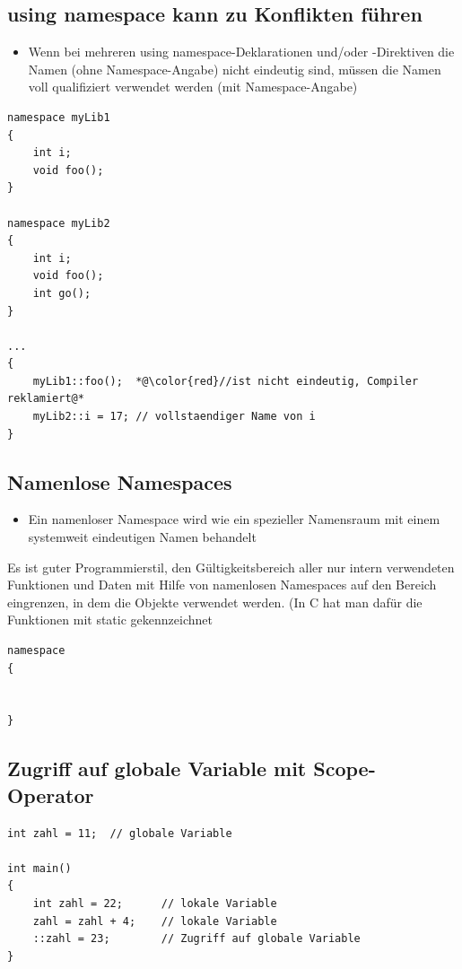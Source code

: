 \subsection{using namespace kann zu Konflikten führen}
\label{sec:using namespace kann zu Konflikten fuehren}
\begin{itemize}
	\item Wenn bei mehreren using namespace-Deklarationen und/oder -Direktiven die Namen (ohne Namespace-Angabe) nicht eindeutig sind, müssen die Namen voll qualifiziert verwendet werden (mit Namespace-Angabe)
\end{itemize}
\noindent
\begin{minipage}{\linewidth}
\begin{lstlisting}
namespace myLib1
{
	int i;
	void foo();
}

namespace myLib2
{
	int i;
	void foo();
	int go();
}

...
{
	myLib1::foo();	*@\color{red}//ist nicht eindeutig, Compiler reklamiert@*
	myLib2::i = 17;	// vollstaendiger Name von i
}
\end{lstlisting}
\end{minipage}

\subsection{Namenlose Namespaces}
\label{sec:Namenlose Namespaces}
\begin{itemize}
	\item Ein namenloser Namespace wird wie ein spezieller Namensraum mit einem systemweit eindeutigen Namen behandelt
\end{itemize}
\begin{hinweis}
Es ist guter Programmierstil, den Gültigkeitsbereich aller nur intern verwendeten Funktionen und Daten mit Hilfe von namenlosen Namespaces auf den Bereich eingrenzen, in dem die Objekte verwendet werden. (In C hat man dafür die Funktionen mit static gekennzeichnet
\end{hinweis}
\noindent
\begin{minipage}{\linewidth}
\begin{lstlisting}
namespace
{


}
\end{lstlisting}
\end{minipage}

\subsection{Zugriff auf globale Variable mit Scope-Operator}
\label{sec:Zugriff auf globale Variable mit Scope-Operator}
\noindent
\begin{minipage}{\linewidth}
\begin{lstlisting}
int zahl = 11;	// globale Variable

int main()
{
	int zahl = 22;		// lokale Variable
	zahl = zahl + 4;	// lokale Variable
	::zahl = 23;		// Zugriff auf globale Variable
}
\end{lstlisting}
\end{minipage}

